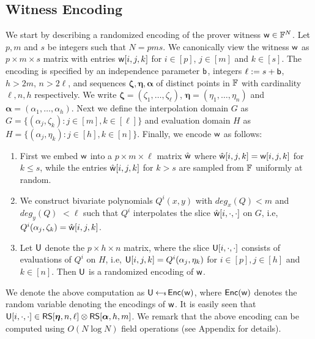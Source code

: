 \subsection{Witness Encoding}\label{sec:witencoding}
We start by describing a randomized encoding of the prover witness $\mathsf{w}\in \mathbb{F}^N$. Let $p,m$ and
$s$ be integers such that $N=pms$. We canonically view the
witness $\mathsf{w}$ 
as $p\times m\times s$ matrix with entries $\mathsf{w}[i,j,k]$ for $i\in [p]$,
$j\in [m]$ and $k\in [s]$. The encoding is specified by an independence 
parameter $\mathsf{b}$, integers $\ell := s+\mathsf{b}$, $h>2m$, $n>2\ell$, and sequences
$\bm{\zeta},\bm{\eta},\bm{\alpha}$ of distinct points in $\mathbb{F}$ with cardinality 
$\ell,n,h$ respectively. We write $\bm{\zeta}=(\zeta_1,\ldots,\zeta_\ell)$,
$\bm{\eta}=(\eta_1,\ldots,\eta_n)$ and $\bm{\alpha}=(\alpha_1,\ldots,\alpha_h)$. 
Next we define the interpolation domain $G$ as $G=\{(\alpha_j,\zeta_k): j\in[m],
k\in [\ell]\}$ and evaluation domain $H$ as $H=\{(\alpha_j,\eta_k): j\in [h],
k\in [n]\}$. Finally, we encode $\mathsf{w}$ as follows:
\begin{enumerate}[{\rm (i)}]
\item First we embed $\mathsf{w}$ into a $p\times m\times \ell$ matrix $\hat{\mathsf{w}}$
where $\hat{\mathsf{w}}[i,j,k]=\mathsf{w}[i,j,k]$ for $k\leq s$, while the entries
$\hat{\mathsf{w}}[i,j,k]$ for $k>s$ are sampled from $\mathbb{F}$ uniformly at random.
\item We construct bivariate polynomials $Q^i(x,y)$ with $deg_x(Q)<m$ and
$deg_y(Q) $ $<\ell$ such that $Q^i$ interpolates the slice
$\hat{\mathsf{w}}[i,\cdot,\cdot]$ on $G$, i.e,
$Q^i(\alpha_j,\zeta_k)=\hat{\mathsf{w}}[i,j,k]$. 
\item Let $\mathsf{U}$ denote the $p\times h\times n$ matrix, where the slice
$\mathsf{U}[i,\cdot,\cdot]$ consists of evaluations of $Q^i$ on $H$, i.e,
$\mathsf{U}[i,j,k]=Q^i(\alpha_j,\eta_k)$ for $i\in [p], j\in [h]$ and $k\in [n]$.
Then $\mathsf{U}$ is a randomized encoding of $\mathsf{w}$.
\end{enumerate}
We denote the above computation as $\mathsf{U}\hskip2.3pt{\gets\!\!\mbox{\tiny${\$}$\normalsize}}\, \mathsf{Enc}(\mathsf{w})$, where $\mathsf{Enc}(\mathsf{w})$
denotes the random variable denoting the encodings of $\mathsf{w}$. It is easily seen
that $\mathsf{U}[i,\cdot,\cdot]\in \mathsf{RS}[\bm{\eta},n,\ell]\otimes \mathsf{RS}[\bm{\alpha},h,m]$. We remark that the above
encoding can be computed using $O(N\log N)$ field operations (see Appendix for
details).
